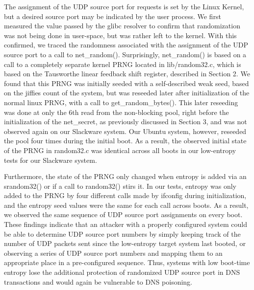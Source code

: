 The assignment of the UDP source port for requests is set by the Linux Kernel, but a desired source port may be indicated by the user process.  We first measured the value passed by the glibc resolver to confirm that randomization was not being done in user-space, but was rather left to the kernel.  With this confirmed, we traced the randomness associated with the assignment of the UDP source port to a call to net\_random().  Surprisingly, net\_random() is based on a call to a completely separate kernel PRNG located in lib/random32.c, which is based on the Tausworthe linear feedback shift register, described in Section 2.  We found that this PRNG was initially seeded with a self-described weak seed, based on the jiffies count of the system, but was reseeded later after initialization of the normal linux PRNG, with a call to get\_random\_bytes().  This later reseeding was done at only the 6th read from the non-blocking pool, right before the initialization of the net\_secret, as previously discussed in Section 3, and was not observed again on our Slackware system.  Our Ubuntu system, however, reseeded the pool four times during the initial boot.  As a result, the observed initial state of the PRNG in random32.c was identical across all boots in our low-entropy tests for our Slackware system.  

Furthermore, the state of the PRNG only changed when entropy is added via an srandom32() or if a call to random32() stirs it.  In our tests, entropy was only added to the PRNG by four different calls made by ifconfig during initialization, and the entropy seed values were the same for each call across boots.  As a result, we observed the same sequence of UDP source port assignments on every boot.  These findings indicate that an attacker with a properly configured system could be able to determine UDP source port numbers by simply keeping track of the number of UDP packets sent since the low-entropy target system last booted, or observing a series of UDP source port numbers and mapping them to an appropriate place in a pre-configured sequence.  Thus, systems with low boot-time entropy lose the additional protection of randomized UDP source port in DNS transactions and would again be vulnerable to DNS poisoning.


  





